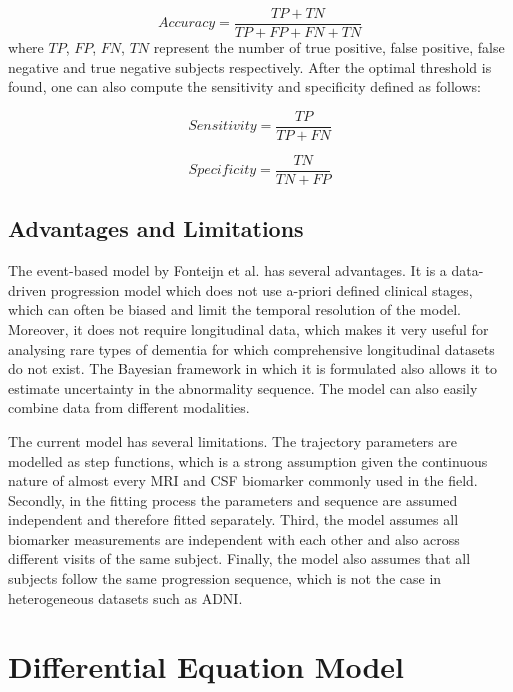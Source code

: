 \begin{equation}
 Accuracy = \frac{TP + TN}{TP + FP + FN + TN}
\end{equation}
where $TP$, $FP$, $FN$, $TN$ represent the number of true positive, false positive, false negative and true negative subjects respectively. After the optimal threshold is found, one can also compute the sensitivity and specificity defined as follows:

\begin{equation}
 Sensitivity = \frac{TP}{TP + FN}
\end{equation}

\begin{equation}
 Specificity = \frac{TN}{TN + FP}
\end{equation}



\subsection{Advantages and Limitations}

The event-based model by Fonteijn et al. \cite{fonteijn2012event} has several advantages. It is a data-driven progression model which does not use a-priori defined clinical stages, which can often be biased and limit the temporal resolution of the model. Moreover, it does not require longitudinal data, which makes it very useful for analysing rare types of dementia for which comprehensive longitudinal datasets do not exist. The Bayesian framework in which it is formulated also allows it to estimate uncertainty in the abnormality sequence. The model can also easily combine data from different modalities.  

The current model has several limitations. The trajectory parameters are modelled as step functions, which is a strong assumption given the continuous nature of almost every MRI and CSF biomarker commonly used in the field. Secondly, in the fitting process the parameters and sequence are assumed independent and therefore fitted separately. Third, the model assumes all biomarker measurements are independent with each other and also across different visits of the same subject.  Finally, the model also assumes that all subjects follow the same progression sequence, which is not the case in heterogeneous datasets such as ADNI.


\section{Differential Equation Model}
\label{sec:dem}


